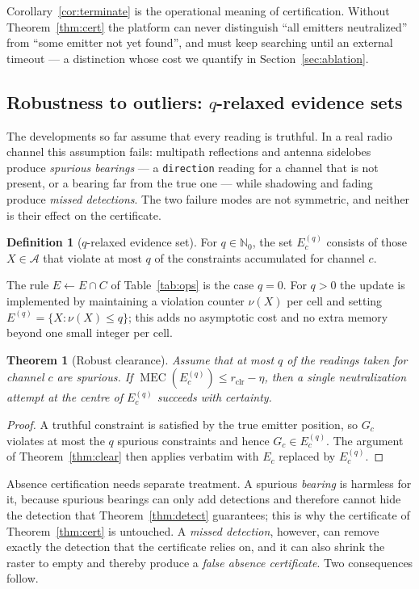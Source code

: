 \documentclass[preprint,12pt,3p]{elsarticle}
\newtheorem{theorem}{Theorem}
\theoremstyle{definition}
\newtheorem{definition}{Definition}
\newcommand{\MEC}{\operatorname{MEC}}
\newcommand{\bA}{\mathcal{A}}
\begin{document}
Corollary~\ref{cor:terminate} is the operational meaning of certification. Without
Theorem~\ref{thm:cert} the platform can never distinguish ``all emitters neutralized'' from
``some emitter not yet found'', and must keep searching until an external timeout --- a
distinction whose cost we quantify in Section~\ref{sec:ablation}.


\subsection{Robustness to outliers: $q$-relaxed evidence sets}
\label{sec:robust}

The developments so far assume that every reading is truthful. In a real radio channel this
assumption fails: multipath reflections and antenna sidelobes produce \emph{spurious bearings}
--- a \texttt{direction} reading for a channel that is not present, or a bearing far from the true
one --- while shadowing and fading produce \emph{missed detections}. The two failure modes are not
symmetric, and neither is their effect on the certificate.

\begin{definition}[$q$-relaxed evidence set]
\label{def:qrelax}
For $q\in\mathbb{N}_0$, the set $E_c^{(q)}$ consists of those $X\in\bA$ that violate at most
$q$ of the constraints accumulated for channel $c$.
\end{definition}

The rule $E\leftarrow E\cap C$ of Table~\ref{tab:ops} is the case $q=0$. For $q>0$ the update is
implemented by maintaining a violation counter $\nu(X)$ per cell and setting
$E^{(q)}=\{X:\nu(X)\le q\}$; this adds no asymptotic cost and no extra memory beyond one small
integer per cell.

\begin{theorem}[Robust clearance]
\label{thm:robustclear}
Assume that at most $q$ of the readings taken for channel $c$ are spurious. If
$\MEC(E_c^{(q)})\le r_{\mathrm{clr}}-\eta$, then a single neutralization attempt at the centre of
$E_c^{(q)}$ succeeds with certainty.
\end{theorem}
\begin{proof}
A truthful constraint is satisfied by the true emitter position, so $G_c$ violates at most the $q$
spurious constraints and hence $G_c\in E_c^{(q)}$. The argument of Theorem~\ref{thm:clear} then
applies verbatim with $E_c$ replaced by $E_c^{(q)}$.
\end{proof}

Absence certification needs separate treatment. A spurious \emph{bearing} is harmless for it,
because spurious bearings can only add detections and therefore cannot hide the detection that
Theorem~\ref{thm:detect} guarantees; this is why the certificate of Theorem~\ref{thm:cert} is
untouched. A \emph{missed detection}, however, can remove exactly the detection that the
certificate relies on, and it can also shrink the raster to empty and thereby produce a
\emph{false absence certificate}. Two consequences follow.
\end{document}

